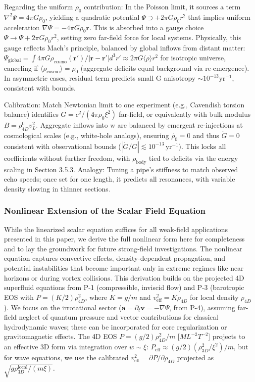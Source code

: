 Regarding the uniform $\rho_0$ contribution: In the Poisson limit, it sources a term $\nabla^2 \Psi = 4\pi G \rho_0$, yielding a quadratic potential $\Psi \supset +2\pi G \rho_0 r^2$ that implies uniform acceleration $\nabla \Psi = -4\pi G \rho_0 \mathbf{r}$. This is absorbed into a gauge choice $\Psi \to \Psi + 2\pi G \rho_0 r^2$, setting zero far-field force for local systems. Physically, this gauge reflects Mach's principle, balanced by global inflows from distant matter: $\Psi_{\text{global}} = \int 4\pi G \rho_{\text{cosmo}}(\mathbf{r}') / |\mathbf{r} - \mathbf{r}'| d^3 r' \approx 2\pi G \langle \rho \rangle r^2$ for isotropic universe, canceling if $\langle \rho_{\text{cosmo}} \rangle = \rho_0$ (aggregate deficits equal background via re-emergence). In asymmetric cases, residual term predicts small G anisotropy $\sim 10^{-13} \mathrm{yr}^{-1}$, consistent with bounds.

Calibration: Match Newtonian limit to one experiment (e.g., Cavendish torsion balance) identifies $G = c^2 / (4\pi \rho_0 \xi^2)$ far-field, or equivalently with bulk modulus $B = \rho_{4D}^0 v_L^2$. Aggregate inflows into w are balanced by emergent re-injections at cosmological scales (e.g., white-hole analogs), ensuring $\dot{\rho_0} = 0$ and thus $\dot{G} = 0$ consistent with observational bounds ($ |\dot{G}/G| \lesssim 10^{-13} \, \mathrm{yr}^{-1} $). This locks all coefficients without further freedom, with $\rho_{\text{body}}$ tied to deficits via the energy scaling in Section 3.5.3. Analogy: Tuning a pipe's stiffness to match observed echo speeds; once set for one length, it predicts all resonances, with variable density slowing in thinner sections.

\subsubsection{Nonlinear Extension of the Scalar Field Equation}

While the linearized scalar equation suffices for all weak-field applications presented in this paper, we derive the full nonlinear form here for completeness and to lay the groundwork for future strong-field investigations. The nonlinear equation captures convective effects, density-dependent propagation, and potential instabilities that become important only in extreme regimes like near horizons or during vortex collisions. This derivation builds on the projected 4D superfluid equations from P-1 (compressible, inviscid flow) and P-3 (barotropic EOS with $P = (K/2) \rho_{4D}^2$, where $K = g/m$ and $v_{\text{eff}}^2 = K \rho_{4D}$ for local density $\rho_{4D}$). We focus on the irrotational sector ($\mathbf{a} = \partial_t \mathbf{v} = -\nabla \Psi$, from P-4), assuming far-field neglect of quantum pressure and vector contributions for classical hydrodynamic waves; these can be incorporated for core regularization or gravitomagnetic effects. The 4D EOS $P = (g/2) \rho_{4D}^2 / m$ [$M L^{-2} T^{-2}$] projects to an effective 3D form via integration over $w \sim \xi$: $P_{\text{eff}} \approx (g/2) (\rho_{3D}^2 / \xi^2) / m$, but for wave equations, we use the calibrated $v_{\text{eff}}^2 = \partial P / \partial \rho_{4D}$ projected as $\sqrt{g \rho_{3D}^{\text{local}} / (m \xi)}$.

